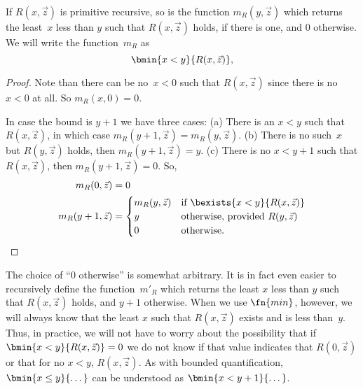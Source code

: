 \documentclass[../../../include/open-logic-section]{subfiles}
\begin{document}


\begin{prop}
If $R(x, \vec z)$ is primitive recursive, so is the function $m_R(y,
\vec{z})$ which returns the least~$x$ less than $y$ such that
$R(x,\vec{z})$ holds, if there is one, and 0 otherwise.  We will write
the function~$m_R$ as
\[
\bmin{x < y}{R(x, \vec{z})},
\]
\end{prop}

\begin{proof}
Note than there can be no~$x < 0$ such that $R(x, \vec{z})$ since
there is no $x < 0$ at all.  So $m_R(x, 0) = 0$.

In case the bound is $y + 1$ we have three cases: (a) There is an $x <
y$ such that $R(x, \vec{z})$, in which case $m_R(y+1, \vec{z}) =
m_R(y, \vec{z})$. (b) There is no such~$x$ but $R(y, \vec{z})$ holds, then
$m_R(y+1, \vec{z}) = y$. (c) There is no $x < y+1$ such that $R(x,
\vec{z})$, then $m_R(y+1,\vec{z}) = 0$. So,
\begin{align*}
m_R(0, \vec{z}) & = 0\\
m_R(y+1, \vec{z}) & =
\begin{cases}
m_R(y, \vec{z}) & \text{if $\bexists{x < y}{R(x, \vec{z})}$} \\
y & \text{otherwise, provided $R(y, \vec{z})$}\\
0 & \text{otherwise.}
\end{cases}
\end{align*}
\end{proof}

\begin{explain}
The choice of ``$0$ otherwise'' is somewhat arbitrary. It is in fact
even easier to recursively define the function~$m'_R$ which returns
the least $x$ less than $y$ such that $R(x,\vec z)$ holds, and $y+1$
otherwise.  When we use $\fn{min}$, however, we will always know that
the least $x$ such that $R(x, \vec z)$ exists and is less
than~$y$. Thus, in practice, we will not have to worry about the
possibility that if $\bmin{x<y}{R(x, \vec{z})} = 0$ we do not know if that
value indicates that $R(0, \vec z)$ or that for no $x < y$, $R(x, \vec
z)$. As with bounded quantification, $\bmin{x \leq y}{\dots}$
can be understood as $\bmin{x < y + 1}{\dots}$.
\end{explain}
\end{document}
